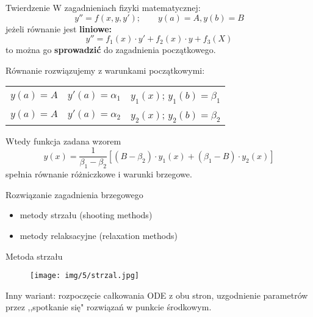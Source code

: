 \begin{frame}
	\begin{block}{Twierdzenie}
		W zagadnieniach fizyki matematycznej:
        $$y'' = f(x,y,y');\qquad y(a) = A, y(b) = B$$
        jeżeli równanie jest \textbf{liniowe:}
        $$y'' = f_1(x)\cdot y'+f_2(x)\cdot y + f_3(X)$$
        to można go \textbf{sprowadzić} do zagadnienia początkowego.
	\end{block}
\end{frame}
\begin{frame}
	Równanie rozwiązujemy z warunkami początkowymi:
    \begin{center}
    	\begin{tabular}{ccc}
    		$y(a) = A$ & $y'(a)=\alpha_1$ & $y_1(x)$;   $y_1(b) = \beta_1$\\
        	$y(a) = A$ & $y'(a)=\alpha_2$ & $y_2(x)$;   $y_2(b) = \beta_2$
    	\end{tabular}
    \end{center}
    Wtedy funkcja zadana wzorem
    $$y(x) = \frac{1}{\beta_1-\beta_2}[(B-\beta_2)\cdot y_1(x)+(\beta_1-B)\cdot y_2(x)]$$
    spełnia równanie różniczkowe i warunki brzegowe.\newline
    \begin{block}{Rozwiązanie zagadnienia brzegowego}
    	\begin{itemize}
          \item metody strzału (shooting methods)
          \item metody relaksacyjne (relaxation methods)
    	\end{itemize}
    \end{block}
\end{frame}
\begin{frame}{Metoda strzału}
	\begin{figure}
		\texttt{[image: img/5/strzal.jpg]}
	\end{figure} 
    Inny wariant:\newline
    \qquad rozpoczęcie całkowania ODE z obu stron, uzgodnienie parametrów przez ,,spotkanie się" rozwiązań w punkcie środkowym.
\end{frame}
